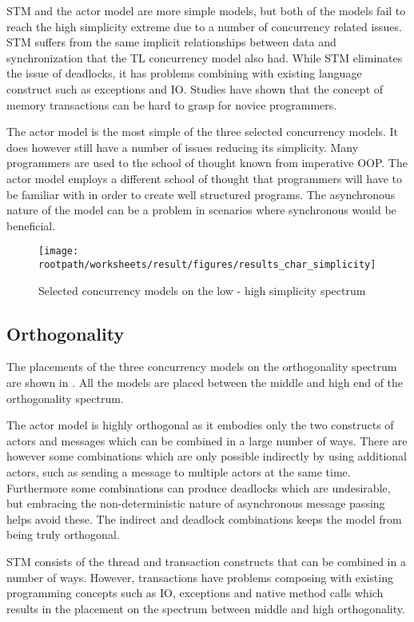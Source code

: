 \ac{STM} and the actor model are more simple models, but both of the models fail to reach the high simplicity extreme due to a number of concurrency related issues. \ac{STM} suffers from the same implicit relationships between data and synchronization that the \ac{TL} concurrency model also had. While \ac{STM} eliminates the issue of deadlocks, it has problems combining with existing language construct such as exceptions and \ac{IO}. Studies have shown that the concept of memory transactions can be hard to grasp for novice programmers.

The actor model is the most simple of the three selected concurrency models. It does however still have a number of issues reducing its simplicity. Many programmers are used to the school of thought known from imperative \ac{OOP}. The actor model employs a different school of thought that programmers will have to be familiar with in order to create well structured programs. The asynchronous nature of the model can be a problem in scenarios where synchronous would be beneficial.

\begin{figure}[htbp]
\centering
 \texttt{[image: \\rootpath/worksheets/result/figures/results\_char\_simplicity]} 
 \caption{Selected concurrency models on the low - high simplicity spectrum}
\label{fig:results_char_simplicity}
\end{figure}

\subsection{Orthogonality}
The placements of the three concurrency models on the orthogonality spectrum are shown in . All the models are placed between the middle and high end of the orthogonality spectrum.

The actor model is highly orthogonal as it embodies only the two constructs of actors and messages which can be combined in a large number of ways. There are however some combinations which are only possible indirectly by using additional actors, such as sending a message to multiple actors at the same time. Furthermore some combinations can produce deadlocks which are undesirable, but embracing the non-deterministic nature of asynchronous message passing helps avoid these. The indirect and deadlock combinations keeps the model from being truly orthogonal.

\ac{STM} consists of the thread and transaction constructs that can be combined in a number of ways. However, transactions have problems
composing with existing programming concepts such as IO, exceptions and
native method calls which results in the placement on the spectrum between middle and high orthogonality.

